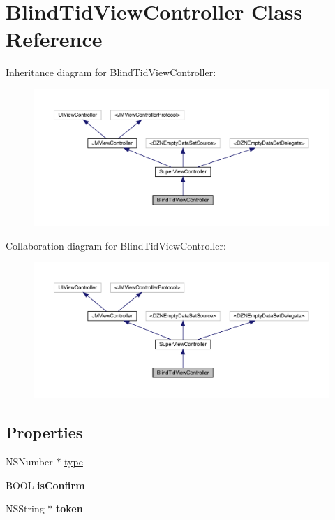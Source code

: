 \hypertarget{interface_blind_tid_view_controller}{}\section{Blind\+Tid\+View\+Controller Class Reference}
\label{interface_blind_tid_view_controller}


Inheritance diagram for Blind\+Tid\+View\+Controller\+:\nopagebreak
\begin{figure}[H]
\begin{center}
\leavevmode
\includegraphics[width=350pt]{interface_blind_tid_view_controller__inherit__graph}
\end{center}
\end{figure}


Collaboration diagram for Blind\+Tid\+View\+Controller\+:\nopagebreak
\begin{figure}[H]
\begin{center}
\leavevmode
\includegraphics[width=350pt]{interface_blind_tid_view_controller__coll__graph}
\end{center}
\end{figure}
\subsection*{Properties}
\begin{DoxyCompactItemize}
\item 
N\+S\+Number $\ast$ \mbox{\hyperlink{interface_blind_tid_view_controller_a8575f85d7ff33fba2aef094d272e0d94}{type}}
\item 
\mbox{\label{interface_blind_tid_view_controller_afe41f5a8bf4082fcfac76df59306a47b}} 
B\+O\+OL {\bfseries is\+Confirm}
\item 
\mbox{\label{interface_blind_tid_view_controller_ae047ac21836607f706719926d0d5840a}} 
N\+S\+String $\ast$ {\bfseries token}
\end{DoxyCompactItemize}

